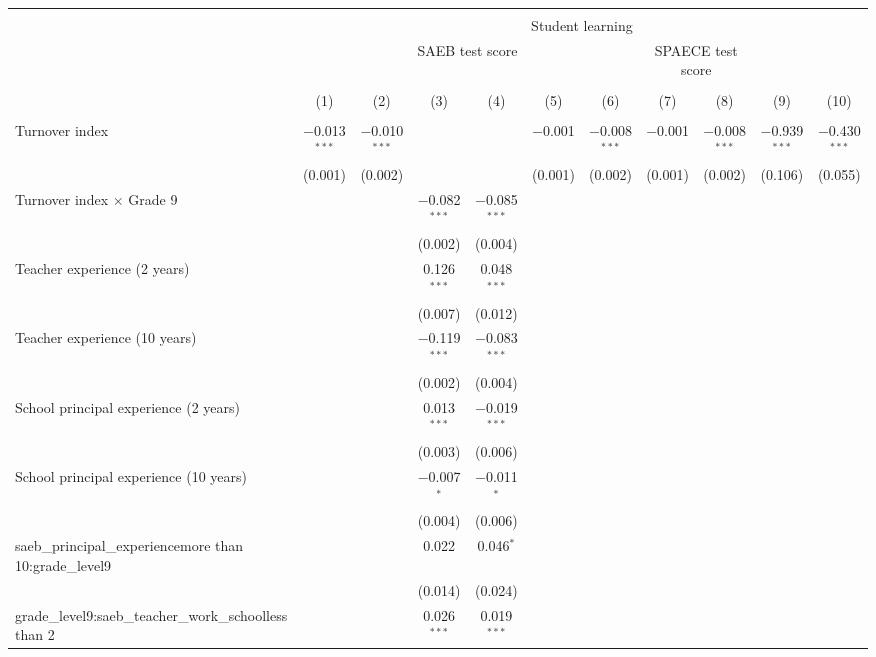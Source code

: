 
\begingroup 
\small 
\begin{tabular}{@{\extracolsep{5pt}}lcccccccccc} 
\\[-1.8ex]\hline 
\hline \\[-1.8ex] 
 & \multicolumn{10}{c}{Student learning} \\ 
\cline{2-11} 
 & \multicolumn{6}{c}{SAEB test score} & \multicolumn{2}{c}{SPAECE test score} &  &  \\ 
\\[-1.8ex] & (1) & (2) & (3) & (4) & (5) & (6) & (7) & (8) & (9) & (10)\\ 
\hline \\[-1.8ex] 
 Turnover index & $-$0.013$^{***}$ & $-$0.010$^{***}$ &  &  & $-$0.001 & $-$0.008$^{***}$ & $-$0.001 & $-$0.008$^{***}$ & $-$0.939$^{***}$ & $-$0.430$^{***}$ \\ 
  & (0.001) & (0.002) &  &  & (0.001) & (0.002) & (0.001) & (0.002) & (0.106) & (0.055) \\ 
  Turnover index $\times$ Grade 9 &  &  & $-$0.082$^{***}$ & $-$0.085$^{***}$ &  &  &  &  &  &  \\ 
  &  &  & (0.002) & (0.004) &  &  &  &  &  &  \\ 
  Teacher experience (2 years) &  &  & 0.126$^{***}$ & 0.048$^{***}$ &  &  &  &  &  &  \\ 
  &  &  & (0.007) & (0.012) &  &  &  &  &  &  \\ 
  Teacher experience (10 years) &  &  & $-$0.119$^{***}$ & $-$0.083$^{***}$ &  &  &  &  &  &  \\ 
  &  &  & (0.002) & (0.004) &  &  &  &  &  &  \\ 
  School principal experience (2 years) &  &  & 0.013$^{***}$ & $-$0.019$^{***}$ &  &  &  &  &  &  \\ 
  &  &  & (0.003) & (0.006) &  &  &  &  &  &  \\ 
  School principal experience (10 years) &  &  & $-$0.007$^{*}$ & $-$0.011$^{*}$ &  &  &  &  &  &  \\ 
  &  &  & (0.004) & (0.006) &  &  &  &  &  &  \\ 
  saeb\_principal\_experiencemore than 10:grade\_level9 &  &  & 0.022 & 0.046$^{*}$ &  &  &  &  &  &  \\ 
  &  &  & (0.014) & (0.024) &  &  &  &  &  &  \\ 
  grade\_level9:saeb\_teacher\_work\_schoolless than 2 &  &  & 0.026$^{***}$ & 0.019$^{***}$ &  &  &  &  &  &  \\ 

\end{tabular}
